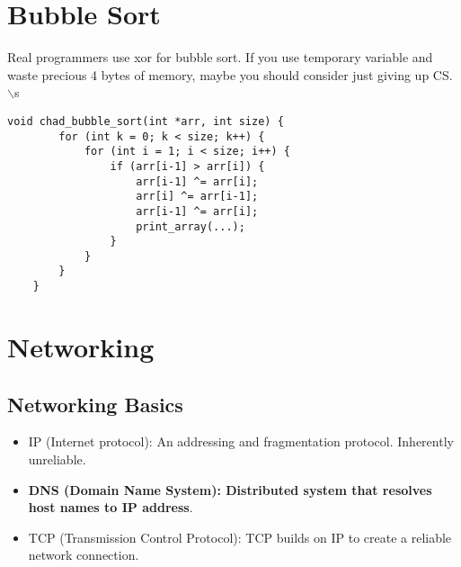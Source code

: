 \documentclass{article}
\begin{document}
\section{Bubble Sort}
Real programmers use xor for bubble sort. If you use temporary variable and waste precious 4 bytes of memory, maybe you should consider just giving up CS. $\backslash$s
\begin{lstlisting}[style=CStyle]
    void chad_bubble_sort(int *arr, int size) {
        for (int k = 0; k < size; k++) {
            for (int i = 1; i < size; i++) {
                if (arr[i-1] > arr[i]) {
                    arr[i-1] ^= arr[i];
                    arr[i] ^= arr[i-1];
                    arr[i-1] ^= arr[i];
                    print_array(...);
                }
            }
        }
    }
\end{lstlisting}

\section{Networking}

\subsection{Networking Basics}
\begin{itemize}
    \item IP (Internet protocol): An addressing and fragmentation protocol. Inherently unreliable.
    \item \textbf{DNS (Domain Name System): Distributed system that resolves host names to IP address}.
    \item TCP (Transmission Control Protocol): TCP builds on IP to create a reliable network connection.
\end{itemize}
\end{document}
